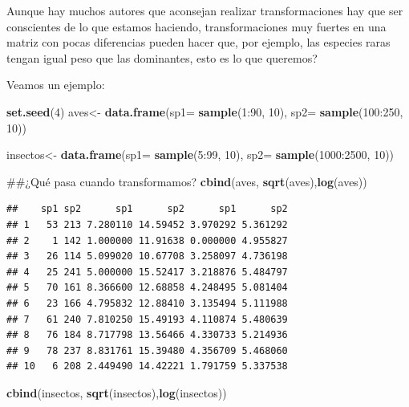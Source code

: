 \documentclass[]{book}
\newenvironment{Shaded}{\begin{snugshade}}{\end{snugshade}}
\newcommand{\KeywordTok}[1]{\textcolor[rgb]{0.13,0.29,0.53}{\textbf{{#1}}}}
\newcommand{\DataTypeTok}[1]{\textcolor[rgb]{0.13,0.29,0.53}{{#1}}}
\newcommand{\DecValTok}[1]{\textcolor[rgb]{0.00,0.00,0.81}{{#1}}}
\newcommand{\StringTok}[1]{\textcolor[rgb]{0.31,0.60,0.02}{{#1}}}
\newcommand{\NormalTok}[1]{{#1}}
\begin{document}
Aunque hay muchos autores que aconsejan realizar transformaciones hay
que ser conscientes de lo que estamos haciendo, transformaciones muy
fuertes en una matriz con pocas diferencias pueden hacer que, por
ejemplo, las especies raras tengan igual peso que las dominantes, esto
es lo que queremos?

Veamos un ejemplo:

\begin{Shaded}
\begin{Highlighting}[]
\KeywordTok{set.seed}\NormalTok{(}\DecValTok{4}\NormalTok{)}
\NormalTok{aves<-}\StringTok{ }\KeywordTok{data.frame}\NormalTok{(}\DataTypeTok{sp1=} \KeywordTok{sample}\NormalTok{(}\DecValTok{1}\NormalTok{:}\DecValTok{90}\NormalTok{, }\DecValTok{10}\NormalTok{), }\DataTypeTok{sp2=} \KeywordTok{sample}\NormalTok{(}\DecValTok{100}\NormalTok{:}\DecValTok{250}\NormalTok{, }\DecValTok{10}\NormalTok{))}

\NormalTok{insectos<-}\StringTok{ }\KeywordTok{data.frame}\NormalTok{(}\DataTypeTok{sp1=} \KeywordTok{sample}\NormalTok{(}\DecValTok{5}\NormalTok{:}\DecValTok{99}\NormalTok{, }\DecValTok{10}\NormalTok{), }\DataTypeTok{sp2=} \KeywordTok{sample}\NormalTok{(}\DecValTok{1000}\NormalTok{:}\DecValTok{2500}\NormalTok{, }\DecValTok{10}\NormalTok{))}

\NormalTok{##¿Qué pasa cuando transformamos?}
\KeywordTok{cbind}\NormalTok{(aves, }\KeywordTok{sqrt}\NormalTok{(aves),}\KeywordTok{log}\NormalTok{(aves))}
\end{Highlighting}
\end{Shaded}

\begin{verbatim}
##    sp1 sp2      sp1      sp2      sp1      sp2
## 1   53 213 7.280110 14.59452 3.970292 5.361292
## 2    1 142 1.000000 11.91638 0.000000 4.955827
## 3   26 114 5.099020 10.67708 3.258097 4.736198
## 4   25 241 5.000000 15.52417 3.218876 5.484797
## 5   70 161 8.366600 12.68858 4.248495 5.081404
## 6   23 166 4.795832 12.88410 3.135494 5.111988
## 7   61 240 7.810250 15.49193 4.110874 5.480639
## 8   76 184 8.717798 13.56466 4.330733 5.214936
## 9   78 237 8.831761 15.39480 4.356709 5.468060
## 10   6 208 2.449490 14.42221 1.791759 5.337538
\end{verbatim}

\begin{Shaded}
\begin{Highlighting}[]
\KeywordTok{cbind}\NormalTok{(insectos, }\KeywordTok{sqrt}\NormalTok{(insectos),}\KeywordTok{log}\NormalTok{(insectos))}
\end{Highlighting}
\end{Shaded}
\end{document}

